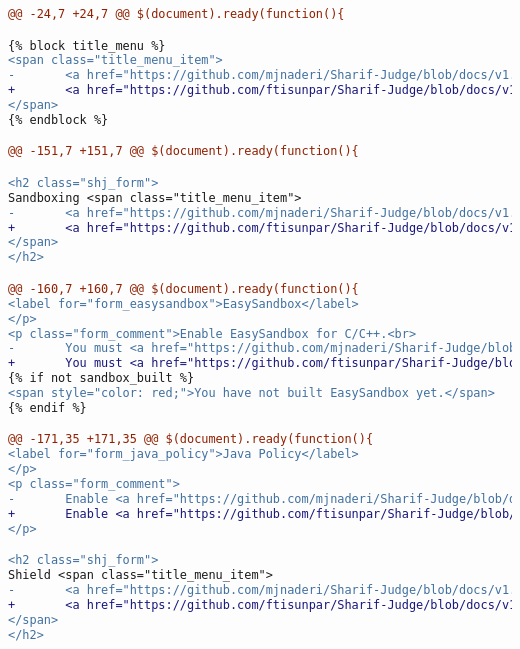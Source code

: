 \begin{lstlisting}[language=diff, basicstyle=\ttfamily, frame=single,
columns=fullflexible, keepspaces=true, breaklines=true]
@@ -24,7 +24,7 @@ $(document).ready(function(){

{% block title_menu %}
<span class="title_menu_item">
-       <a href="https://github.com/mjnaderi/Sharif-Judge/blob/docs/v1.4/settings.md" target="_blank"><i class="fa fa-question-circle color6"></i> Help</a>
+       <a href="https://github.com/ftisunpar/Sharif-Judge/blob/docs/v1.4/settings.md" target="_blank"><i class="fa fa-question-circle color6"></i> Help</a>
</span>
{% endblock %}

@@ -151,7 +151,7 @@ $(document).ready(function(){

<h2 class="shj_form">
Sandboxing <span class="title_menu_item">
-       <a href="https://github.com/mjnaderi/Sharif-Judge/blob/docs/v1.4/sandboxing.md" target="_blank"><i class="fa fa-question-circle color11"></i> Help</a>
+       <a href="https://github.com/ftisunpar/Sharif-Judge/blob/docs/v1.4/sandboxing.md" target="_blank"><i class="fa fa-question-circle color11"></i> Help</a>
</span>
</h2>

@@ -160,7 +160,7 @@ $(document).ready(function(){
<label for="form_easysandbox">EasySandbox</label>
</p>
<p class="form_comment">Enable EasySandbox for C/C++.<br>
-       You must <a href="https://github.com/mjnaderi/Sharif-Judge/blob/docs/v1.4/sandboxing.md#build-easysandbox" target="_blank">build EasySandbox</a> before enabling it.<br>
+       You must <a href="https://github.com/ftisunpar/Sharif-Judge/blob/docs/v1.4/sandboxing.md#build-easysandbox" target="_blank">build EasySandbox</a> before enabling it.<br>
{% if not sandbox_built %}
<span style="color: red;">You have not built EasySandbox yet.</span>
{% endif %}

@@ -171,35 +171,35 @@ $(document).ready(function(){
<label for="form_java_policy">Java Policy</label>
</p>
<p class="form_comment">
-       Enable <a href="https://github.com/mjnaderi/Sharif-Judge/blob/docs/v1.4/sandboxing.md#java-sandboxing" target="_blank">Java Sandboxing</a>
+       Enable <a href="https://github.com/ftisunpar/Sharif-Judge/blob/docs/v1.4/sandboxing.md#java-sandboxing" target="_blank">Java Sandboxing</a>
</p>

<h2 class="shj_form">
Shield <span class="title_menu_item">
-       <a href="https://github.com/mjnaderi/Sharif-Judge/blob/docs/v1.4/shield.md" target="_blank"><i class="fa fa-question-circle color11"></i> Help</a>
+       <a href="https://github.com/ftisunpar/Sharif-Judge/blob/docs/v1.4/shield.md" target="_blank"><i class="fa fa-question-circle color11"></i> Help</a>
</span>
</h2>


\end{lstlisting}
